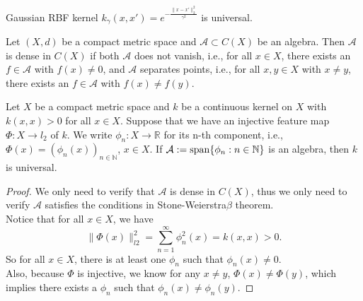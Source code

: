 \begin{corollary}
	Gaussian RBF kernel $k_{\gamma}(x,x') = e^{-\frac{\|x-x'\|_2^2}{\gamma^2}}$ is universal.
\end{corollary}

\begin{theorem}
	Let $(X,d)$ be a compact metric space and $\mathcal{A}\subset C(X)$ be an algebra. Then $\mathcal{A}$ is dense in $C(X)$ if both $\mathcal{A}$ does not vanish, i.e., for all $x\in X$, there exists an $f\in \mathcal{A}$ with $f(x)\neq 0$, and $\mathcal{A}$ separates points, i.e., for all $x,y\in X$ with $x\neq y$, there exists an $f\in \mathcal{A}$ with $f(x)\neq f(y)$.
\end{theorem}

\begin{theorem}
	Let $X$ be a compact metric space and $k$ be a continuous kernel on $X$ with $k(x,x)>0$ for all $x\in X$. Suppose that we have an injective feature map $\Phi: X\rightarrow l_2$ of $k$. We write $\phi_n: X\rightarrow \mathbb{R}$ for its n-th component, i.e., $\Phi(x) = (\phi_n(x))_{n\in \mathbb{N}}$, $x\in X$. If $\mathcal{A}:= {\rm span} \{\phi_n: n\in \mathbb{N}\}$ is an algebra, then $k$ is universal.
\end{theorem}

\begin{proof}
	We only need to verify that $\mathcal{A}$ is dense in $C(X)$, thus we only need to verify $\mathcal{A}$ satisfies the conditions in Stone-Weierstra$\beta$ theorem. \\
	Notice that for all $x\in X$, we have
	\begin{equation}
	\|\Phi(x)\|_{l2}^2 = \sum_{n=1}^{\infty} \phi_n^2(x) = k(x,x) >0.
	\end{equation}
	So for all $x\in X$, there is at least one $\phi_n$ such that $\phi_n(x) \neq 0$.\\
	Also, because $\Phi$ is injective, we know for any $x\neq y$, $\Phi(x)\neq \Phi(y)$, which implies there exists a $\phi_n$ such that $\phi_n(x) \neq \phi_n(y)$.
	
\end{proof}